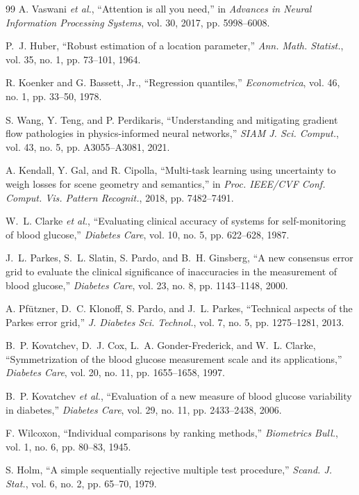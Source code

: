 \documentclass[journal]{IEEEtran}
\begin{document}
\begin{thebibliography}{99}
 A. Vaswani \emph{et al.}, ``Attention is all you need,'' in \emph{Advances in Neural Information Processing Systems}, vol. 30, 2017, pp. 5998--6008.

 P.~J. Huber, ``Robust estimation of a location parameter,'' \emph{Ann. Math. Statist.}, vol. 35, no. 1, pp. 73--101, 1964.

 R. Koenker and G. Bassett, Jr., ``Regression quantiles,'' \emph{Econometrica}, vol. 46, no. 1, pp. 33--50, 1978.

 S. Wang, Y. Teng, and P. Perdikaris, ``Understanding and mitigating gradient flow pathologies in physics-informed neural networks,'' \emph{SIAM J. Sci. Comput.}, vol. 43, no. 5, pp. A3055--A3081, 2021.

 A. Kendall, Y. Gal, and R. Cipolla, ``Multi-task learning using uncertainty to weigh losses for scene geometry and semantics,'' in \emph{Proc. IEEE/CVF Conf. Comput. Vis. Pattern Recognit.}, 2018, pp. 7482--7491.

 W.~L. Clarke \emph{et al.}, ``Evaluating clinical accuracy of systems for self-monitoring of blood glucose,'' \emph{Diabetes Care}, vol. 10, no. 5, pp. 622--628, 1987.

 J.~L. Parkes, S.~L. Slatin, S. Pardo, and B.~H. Ginsberg, ``A new consensus error grid to evaluate the clinical significance of inaccuracies in the measurement of blood glucose,'' \emph{Diabetes Care}, vol. 23, no. 8, pp. 1143--1148, 2000.

 A. Pf\"utzner, D.~C. Klonoff, S. Pardo, and J.~L. Parkes, ``Technical aspects of the Parkes error grid,'' \emph{J. Diabetes Sci. Technol.}, vol. 7, no. 5, pp. 1275--1281, 2013.

 B.~P. Kovatchev, D.~J. Cox, L.~A. Gonder-Frederick, and W.~L. Clarke, ``Symmetrization of the blood glucose measurement scale and its applications,'' \emph{Diabetes Care}, vol. 20, no. 11, pp. 1655--1658, 1997.

 B.~P. Kovatchev \emph{et al.}, ``Evaluation of a new measure of blood glucose variability in diabetes,'' \emph{Diabetes Care}, vol. 29, no. 11, pp. 2433--2438, 2006.

 F. Wilcoxon, ``Individual comparisons by ranking methods,'' \emph{Biometrics Bull.}, vol. 1, no. 6, pp. 80--83, 1945.

 S. Holm, ``A simple sequentially rejective multiple test procedure,'' \emph{Scand. J. Stat.}, vol. 6, no. 2, pp. 65--70, 1979.


\end{thebibliography}
\end{document}
